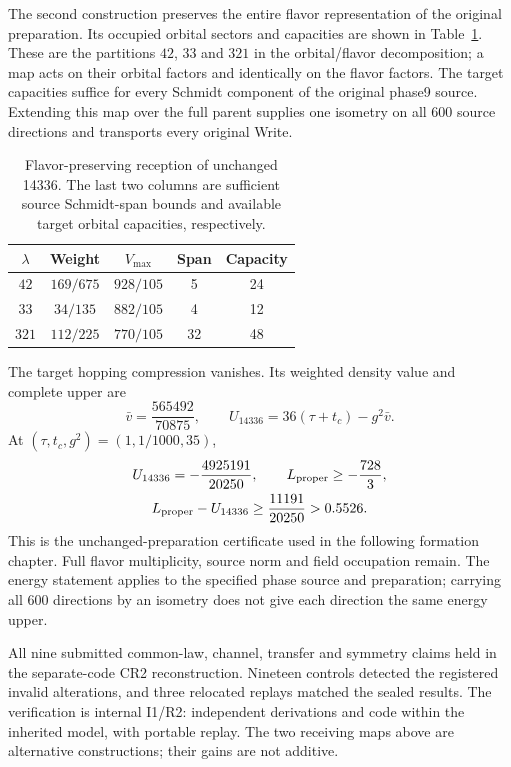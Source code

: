 The second construction preserves the entire flavor representation of the
original preparation. Its occupied orbital sectors and capacities are
shown in Table~\ref{tab:flavor-new}. These are the partitions $42$, $33$
and $321$ in the orbital/flavor decomposition; a map acts on their orbital
factors and identically on the flavor factors. The target capacities suffice
for every Schmidt component of the original phase9 source. Extending this
map over the full parent supplies one isometry on all 600 source directions
and transports every original Write.

\begin{table}[htbp]
\centering\small
\caption{Flavor-preserving reception of unchanged 14336. The last two
columns are sufficient source Schmidt-span bounds and available target
orbital capacities, respectively.}
\begin{tabular}{ccccc}\toprule
$\lambda$ & Weight & $V_{\max}$ & Span & Capacity\\\midrule
$42$ & $169/675$ & $928/105$ & 5 &24\\
$33$ & $34/135$ & $882/105$ & 4 &12\\
$321$ & $112/225$ & $770/105$ &32 &48\\\bottomrule
\end{tabular}
\label{tab:flavor-new}
\end{table}

The target hopping compression vanishes. Its weighted density value and
complete upper are
\begin{equation}
\bar v=\frac{565492}{70875},\qquad
U_{14336}=36(\tau+t_c)-g^2\bar v.
\end{equation}
At $(\tau,t_c,g^2)=(1,1/1000,35)$,
\begin{equation}
\begin{gathered}
U_{14336}=-\frac{4925191}{20250},\qquad
L_{\rm proper}\geq-\frac{728}{3},\\
L_{\rm proper}-U_{14336}\geq\frac{11191}{20250}>0.5526.
\label{eq:held-margin-new}
\end{gathered}
\end{equation}
This is the unchanged-preparation certificate used in the following
formation chapter. Full flavor multiplicity, source norm and field
occupation remain. The energy statement applies to the specified phase
source and preparation; carrying all 600 directions by an isometry does
not give each direction the same energy upper.

All nine submitted common-law, channel, transfer and symmetry claims held
in the separate-code CR2 reconstruction. Nineteen controls detected the
registered invalid alterations, and three relocated replays matched the
sealed results. The verification is internal I1/R2: independent derivations
and code within the inherited model, with portable replay. The two
receiving maps above are alternative constructions; their gains are not
additive.

